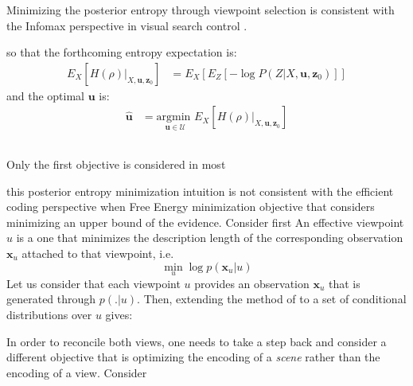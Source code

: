 \documentclass{article}
\begin{document}
Minimizing the posterior entropy through viewpoint selection is consistent with the Infomax perspective in visual search control \cite{najemnik2005optimal,butko2010infomax}.



so that the forthcoming entropy expectation is:
\begin{align}
E_{X}\left[H(\rho)|_{X, \boldsymbol{u}, \boldsymbol{z}_0}\right] &=  E_{X}\left[E_{Z}\left[-\log  P(Z|X,\boldsymbol{u},\boldsymbol{z}_0)\right]\right]
\end{align}
and the optimal $\boldsymbol{u}$ is:
\begin{align}
\hat{\boldsymbol{u}} &= \underset{\boldsymbol{u} \in \mathcal{U}}{\text{argmin }} E_{X}\left[H(\rho)|_{X, \boldsymbol{u}, \boldsymbol{z}_0}\right]
\end{align}

\subsection{}

Only the first objective is considered in most 


this posterior entropy minimization intuition is  not consistent with the efficient coding perspective when Free Energy minimization objective that considers minimizing an upper bound of the evidence.
Consider first
An effective viewpoint $u$ is a one that minimizes the description length of the corresponding observation $\boldsymbol{x}_u$ attached to that viewpoint, i.e. 
$$\min_u \log p(\boldsymbol{x}_u|u)$$
Let us consider that each viewpoint $u$ provides an observation $\boldsymbol{x}_u$ that is generated through $p(.|u)$. Then, extending the method of \cite{hinton1994autoencoders, kingma2013auto} to a set of conditional distributions over $u$ gives:




In order to reconcile both views, one needs to take a step back and consider a different objective that is optimizing the encoding of a \emph{scene} rather than the encoding of a view. Consider 
  
\end{document}
